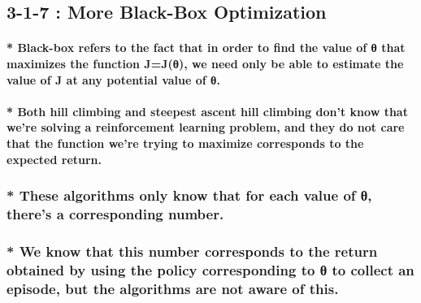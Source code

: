 \documentclass[11pt]{article}
\begin{document}
    \hypertarget{more-black-box-optimization}{%
\subsection{3-1-7 : More Black-Box
Optimization}\label{more-black-box-optimization}}

\hypertarget{black-box-refers-to-the-fact-that-in-order-to-find-the-value-of-ux3b8-that-maximizes-the-function-jjux3b8-we-need-only-be-able-to-estimate-the-value-of-j-at-any-potential-value-of-ux3b8.}{%
\paragraph{* Black-box refers to the fact that in order to find the
value of θ that maximizes the function J=J(θ), we need only be able to
estimate the value of J at any potential value of
θ.}\label{black-box-refers-to-the-fact-that-in-order-to-find-the-value-of-ux3b8-that-maximizes-the-function-jjux3b8-we-need-only-be-able-to-estimate-the-value-of-j-at-any-potential-value-of-ux3b8.}}

\hypertarget{both-hill-climbing-and-steepest-ascent-hill-climbing-dont-know-that-were-solving-a-reinforcement-learning-problem-and-they-do-not-care-that-the-function-were-trying-to-maximize-corresponds-to-the-expected-return.}{%
\paragraph{* Both hill climbing and steepest ascent hill climbing don't
know that we're solving a reinforcement learning problem, and they do
not care that the function we're trying to maximize corresponds to the
expected
return.}\label{both-hill-climbing-and-steepest-ascent-hill-climbing-dont-know-that-were-solving-a-reinforcement-learning-problem-and-they-do-not-care-that-the-function-were-trying-to-maximize-corresponds-to-the-expected-return.}}

\hypertarget{these-algorithms-only-know-that-for-each-value-of-ux3b8-theres-a-corresponding-number.}{%
\subsubsection{* These algorithms only know that for each value of θ,
there's a corresponding
number.}\label{these-algorithms-only-know-that-for-each-value-of-ux3b8-theres-a-corresponding-number.}}

\hypertarget{we-know-that-this-number-corresponds-to-the-return-obtained-by-using-the-policy-corresponding-to-ux3b8-to-collect-an-episode-but-the-algorithms-are-not-aware-of-this.}{%
\subsubsection{* We know that this number corresponds to the return
obtained by using the policy corresponding to θ to collect an episode,
but the algorithms are not aware of
this.}\label{we-know-that-this-number-corresponds-to-the-return-obtained-by-using-the-policy-corresponding-to-ux3b8-to-collect-an-episode-but-the-algorithms-are-not-aware-of-this.}}
\end{document}
